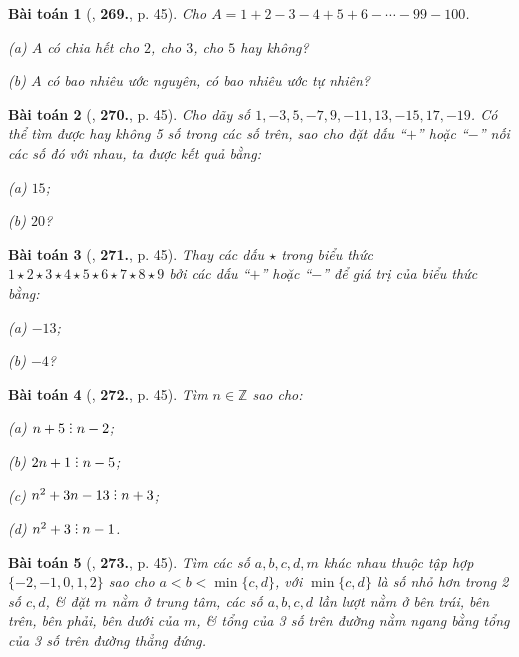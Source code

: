 \documentclass{article}
\numberwithin{equation}{section}
\newtheorem{baitoan}{Bài toán}
\DeclareRobustCommand{\divby}{%
	\mathrel{\vbox{\baselineskip.65ex\lineskiplimit0pt\hbox{.}\hbox{.}\hbox{.}}}%
}
\begin{document}
\begin{baitoan}[\cite{Binh_Toan_6_tap_1}, \textbf{269.}, p. 45]
	Cho $A = 1 + 2 - 3 - 4 + 5 + 6 - \cdots - 99 - 100$.
	\begin{enumerate*}
		\item[(a)] $A$ có chia hết cho $2$, cho $3$, cho $5$ hay không?
		\item[(b)] $A$ có bao nhiêu ước nguyên, có bao nhiêu ước tự nhiên?
	\end{enumerate*}
\end{baitoan}

\begin{baitoan}[\cite{Binh_Toan_6_tap_1}, \textbf{270.}, p. 45]
	Cho dãy số $1,-3,5,-7,9,-11,13,-15,17,-19$. Có thể tìm được hay không 5 số trong các số trên, sao cho đặt dấu ``$+$'' hoặc ``$-$'' nối các số đó với nhau, ta được kết quả bằng:
	\begin{enumerate*}
		\item[(a)] $15$;
		\item[(b)] $20$?
	\end{enumerate*}
\end{baitoan}

\begin{baitoan}[\cite{Binh_Toan_6_tap_1}, \textbf{271.}, p. 45]
	Thay các dấu  $\star$ trong biểu thức $1\star2\star3\star4\star5\star6\star7\star8\star9$ bởi các dấu ``$+$'' hoặc ``$-$'' để giá trị của biểu thức bằng:
	\begin{enumerate*}
		\item[(a)] $-13$;
		\item[(b)] $-4$?
	\end{enumerate*}
\end{baitoan}

\begin{baitoan}[\cite{Binh_Toan_6_tap_1}, \textbf{272.}, p. 45]
	Tìm $n\in\mathbb{Z}$ sao cho:
	\begin{enumerate*}
		\item[(a)] $n + 5\divby n - 2$;
		\item[(b)] $2n + 1\divby n - 5$;
		\item[(c)] $n^2 + 3n - 13\divby n + 3$;
		\item[(d)] $n^2 + 3\divby n - 1$.
	\end{enumerate*}
\end{baitoan}

\begin{baitoan}[\cite{Binh_Toan_6_tap_1}, \textbf{273.}, p. 45]
	Tìm các số $a,b,c,d,m$ khác nhau thuộc tập hợp $\{-2,-1,0,1,2\}$ sao cho $a < b < \min\{c,d\}$, với $\min\{c,d\}$ là số nhỏ hơn trong 2 số $c,d$, \& đặt $m$ nằm ở trung tâm, các số $a,b,c,d$ lần lượt nằm ở bên trái, bên trên, bên phải, bên dưới của $m$, \& tổng của 3 số trên đường nằm ngang bằng tổng của 3 số trên đường thẳng đứng.
\end{baitoan}
\end{document}
